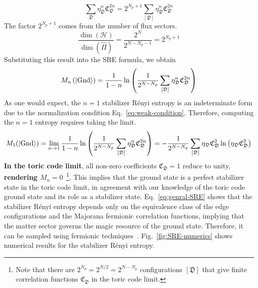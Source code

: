\[
\sum_{\mathfrak{D}} \eta_\mathfrak{D}^n \mathfrak{C}_\mathfrak{D}^{2n}
=
2^{N_p + 1}
\sum_{[\mathfrak{D}]} \eta_\mathfrak{D}^n
\mathfrak{C}_\mathfrak{D}^{2n}
\]
The factor $2^{N_p+1}$ comes from the number of flux sectors. 
\[
\frac{\dim(\mathcal{H})}{\dim(\hat{\Pi})}
=
\frac{2^N}{2^{N-N_p-1}} = 2^{N_p + 1}
\]
Substituting this result into the SRE formula, we obtain
\begin{equation}
    M_n\left( | \mathrm{Gnd} \rangle \right) 
    =
    \frac{1}{1 - n}
    \ln\left( 
        \frac{1}{2^{N - N_p}}
        \sum_{[\mathfrak{D}]} \eta_\mathfrak{D}^n \mathfrak{C}_\mathfrak{D}^{2n}
     \right)
\end{equation}
As one would expect, the $n = 1$ stabilizer R\'enyi entropy is an indeterminate form due to the normalization condition Eq.~\eqref{eq:weak-condition}. Therefore, computing the $n=1$ entropy requires taking the limit.
\[
    M_1(| \mathrm{Gnd} \rangle) 
    = 
    \lim_{n\to 1} 
    \frac{1}{1 - n}
    \ln\left( 
        \frac{1}{2^{N - N_p}}
        \sum_{[\mathfrak{D}]} \eta_\mathfrak{D}^n \mathfrak{C}_\mathfrak{D}^{2n}
     \right)
    =
    -\frac{1}{2^{N-N_p}}
    \sum_{[\mathfrak{D}]} \eta_\mathfrak{D}\mathfrak{C}_\mathfrak{D}^2
    \ln\left( \eta_\mathfrak{D}\mathfrak{C}_\mathfrak{D}^2 \right)
\]
\textbf{In the toric code limit}, all non-zero coefficients $\mathfrak{C}_\mathfrak{D} = 1$ reduce to unity, \textbf{rendering $M_n = 0$}~\footnote{Note that there are $2^{N_d} = 2^{N/2} = 2^{N-N_p}$ configurations $[\mathfrak{D}]$ that give finite correlation functions $\mathfrak{C}_\mathfrak{D}$ in the toric code limit.}. This implies that the ground state is a perfect stabilizer state in the toric code limit, in agreement with our knowledge of the toric code ground state and its role as a stabilizer state. Eq.~\eqref{eq:genral-SRE} shows that the stabilizer R\'enyi entropy depends only on the equivalence class of the edge configurations and the Majorana fermionic correlation functions, implying that the matter sector governs the magic resource of the ground state. Therefore, it can be sampled using fermionic techniques~\cite{Wang-Yang-Zhou-Chen_2025}. Fig.~\ref{fig:SRE-numerics} shows numerical results for the stabilizer R\'enyi entropy. 
